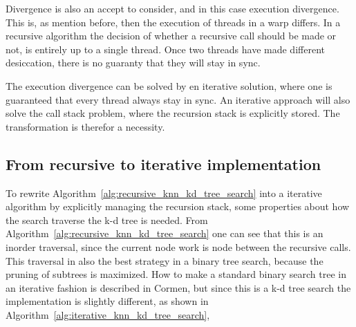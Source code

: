 Divergence is also an accept to consider, and in this case execution divergence. This is, as mention before, then the execution of threads in a warp differs. In a recursive algorithm the decision of whether a recursive call should be made or not, is entirely up to a single thread. Once two threads have made different desiccation, there is no guaranty that they will stay in sync.

The execution divergence can be solved by en iterative solution, where one is guaranteed that every thread always stay in sync. An iterative approach will also solve the call stack problem, where the recursion stack is explicitly stored. The transformation is therefor a necessity.



\subsection{From recursive to iterative implementation} %
\label{sub:from_recursive_to_iterative_implementation}


To rewrite Algorithm~\ref{alg:recursive_knn_kd_tree_search} into a iterative algorithm by  explicitly managing the recursion stack, some properties about how the search traverse the k-d tree is needed. From Algorithm~\ref{alg:recursive_knn_kd_tree_search} one can see that this is an inorder traversal, since the current node work is node between the recursive calls. This traversal in also the best strategy in a binary tree search, because the pruning of subtrees is maximized. How to make a standard binary search tree in an iterative fashion is described in Cormen\cite[Chapter 12]{Cormen:2001}, but since this is a k-d tree search the implementation is slightly different, as shown in Algorithm~\ref{alg:iterative_knn_kd_tree_search},


